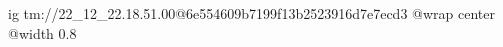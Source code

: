  
 
 
 
 

\qqSecOrig


\ifcmt
  ig tm://22_12_22.18.51.00@6e554609b7199f13b2523916d7e7ecd3
  @wrap center
  @width 0.8
\fi

